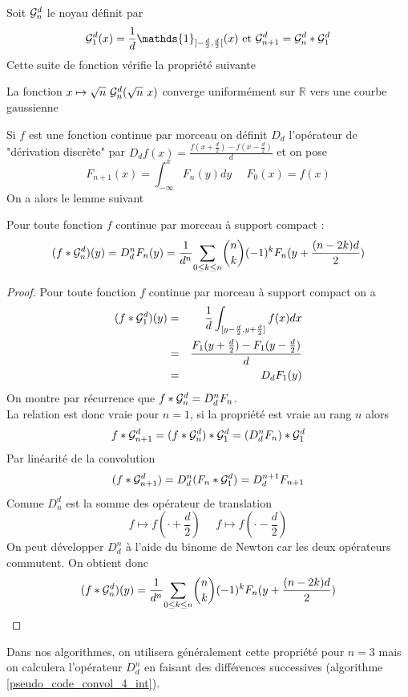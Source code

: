 Soit $\mathcal{G}_n^d$ le noyau définit par 
\begin{equation*}
\Gcal_1^d(x)=\frac{1}{d}\mathds{1}_{]-\frac{d}{2},\frac{d}{2}[}(x) \text{ et } \Gcal_{n+1}^d= \Gcal_n^d * \Gcal_1^d 
\label{formule_convol_n_int}
\end{equation*}
Cette suite de fonction vérifie la propriété suivante
\begin{prop}
La fonction $x\mapsto \sqrt{n}~\mathcal{G}_n^d(\sqrt{n}~x)$ converge uniformément sur $\mathbb{R}$ vers une courbe gaussienne 
\end{prop}
Si $f$ est une fonction continue par morceau on définit $D_d$ l'opérateur de "dérivation discrète" par $D_d f(x)=\frac{f(x+\frac{d}{2})-f(x-\frac{d}{2})}{d}$  et on pose
\begin{equation*}
F_{n+1}(x)= \int_{-\infty}^{x}F_{n}(y)dy~~~~~~F_{0}(x)= f(x)
\end{equation*}
On a alors le lemme suivant 
\begin{prop} Pour toute fonction $f$ continue par morceau à support compact :
\begin{equation}
 (f*\mathcal{G}_n^d)(y)=D_d^n F_{n}(y)= \frac{1}{d^n}\underset{0 \le k\le n}{\sum} \binom{n}{k}(-1)^{k} F_{n}(y+\frac{(n-2k)d}{2})
\end{equation}
\end{prop}
\begin{proof}
Pour toute fonction $f$ continue par morceau à support compact on a 
\begin{eqnarray*}
(f * \mathcal{G}_1^d )(y)&=&\frac{1}{d} \int_{[y-\frac{d}{2},y+\frac{d}{2}]} f(x) dx\\
               &=&\frac{F_{1}(y+\frac{d}{2})-F_{1}(y-\frac{d}{2})}{d}\\
               &=&D_d F_{1}(y)
\end{eqnarray*}
On montre par récurrence que $ f*\mathcal{G}_n^d=D_d^n F_{n}$.\\
La relation est donc vraie pour $n=1$, si la propriété est vraie au rang $n$ alors
\begin{equation*}
f*\mathcal{G}_{n+1}^{d}=(f * \mathcal{G}_{n}^d) * \mathcal{G}_{1}^{d}= (D_d^n F_{n})*\mathcal{G}_1^d 
\end{equation*}
Par linéarité de la convolution
\begin{equation*}
(f*\mathcal{G}_{n+1}^{d}) = D_d^n (F_{n}*\mathcal{G}_1^d) = D_d^{n+1} F_{n+1}
\end{equation*}
Comme $D_n^d$ est la somme des opérateur de translation
\begin{equation*}
f\mapsto f(\cdot+\frac{d}{2})~~~~~~f\mapsto f(\cdot-\frac{d}{2})
\end{equation*}
On peut développer $D_d^n$ à l'aide du binome de Newton car les deux opérateurs commutent. On obtient donc
\begin{equation*}
(f*\mathcal{G}_n^d)(y) = \frac{1}{d^n}\underset{0 \le k\le n}{\sum} \binom{n}{k}(-1)^{k} F_{n}(y+\frac{(n-2k)d}{2})
\end{equation*}

\end{proof}
Dans nos algorithmes, on utilisera généralement cette propriété pour $n=3$ mais on calculera l'opérateur $D_d^n$ en faisant des différences successives (algorithme \ref{pseudo_code_convol_4_int}).

